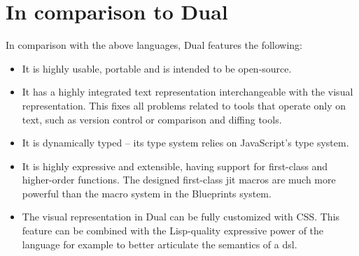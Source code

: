 \section{In comparison to Dual}
In comparison with the above languages, Dual features the following:
\begin{itemize}
\item It is highly usable, portable and is intended to be open-source.
\item It has a highly integrated text representation interchangeable with the visual representation. This fixes all problems related to tools that operate only on text, such as version control or comparison and diffing tools.
\item It is dynamically typed -- its type system relies on JavaScript's type system.
\item It is highly expressive and extensible, having support for first-class and higher-order functions. The designed first-class \acrshort{jit} macros are much more powerful than the macro system in the Blueprints system.
\item The visual representation in Dual can be fully customized with CSS. This feature can be combined with the Lisp-quality expressive power of the language for example to better articulate the semantics of a \acrshort{dsl}.
\end{itemize}



    
        

    
